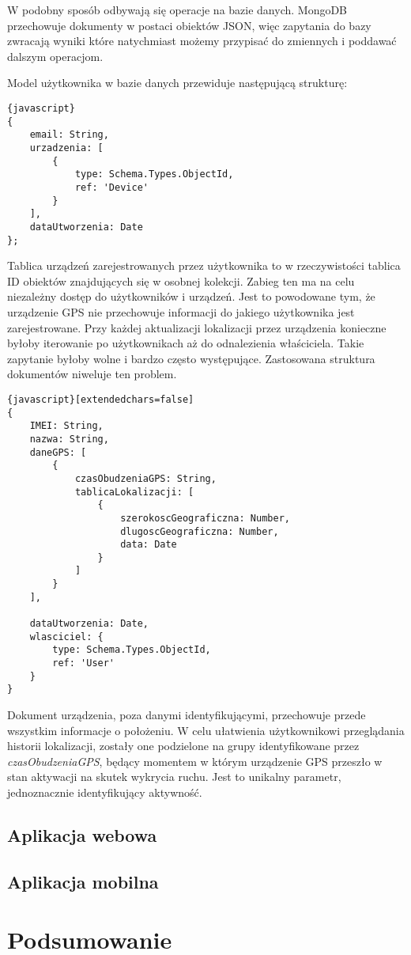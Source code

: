 \documentclass[eng,printmode]{mgr}
\begin{document}
W podobny sposób odbywają się operacje na bazie danych. MongoDB przechowuje dokumenty w postaci obiektów JSON, więc zapytania do bazy zwracają wyniki które natychmiast możemy przypisać do zmiennych i poddawać dalszym operacjom.

Model użytkownika w bazie danych przewiduje następującą strukturę:
\begin{lstlisting}{javascript}
{
    email: String,
    urzadzenia: [
        {
            type: Schema.Types.ObjectId,
            ref: 'Device'
        }
    ],
    dataUtworzenia: Date
};
\end{lstlisting}
Tablica urządzeń zarejestrowanych przez użytkownika to w rzeczywistości tablica ID obiektów znajdujących się w osobnej kolekcji. Zabieg ten ma na celu niezależny dostęp do użytkowników i urządzeń. Jest to powodowane tym, że urządzenie GPS nie przechowuje informacji do jakiego użytkownika jest zarejestrowane. Przy każdej aktualizacji lokalizacji przez urządzenia konieczne byłoby iterowanie po użytkownikach aż do odnalezienia właściciela. Takie zapytanie byłoby wolne i bardzo często występujące. Zastosowana struktura dokumentów niweluje ten problem.

\begin{lstlisting}{javascript}[extendedchars=false]
{
    IMEI: String,
    nazwa: String,
    daneGPS: [
        {
            czasObudzeniaGPS: String,
            tablicaLokalizacji: [
                {
                    szerokoscGeograficzna: Number,
                    dlugoscGeograficzna: Number,                    
                    data: Date
                }
            ]
        }
    ],

    dataUtworzenia: Date,
    wlasciciel: {
        type: Schema.Types.ObjectId,
        ref: 'User'
    }
}
\end{lstlisting}
Dokument urządzenia, poza danymi identyfikującymi, przechowuje przede wszystkim informacje o położeniu. W celu ułatwienia użytkownikowi przeglądania historii lokalizacji, zostały one podzielone na grupy identyfikowane przez \textit{czasObudzeniaGPS}, będący momentem w którym urządzenie GPS przeszło w stan aktywacji na skutek wykrycia ruchu. Jest to unikalny parametr, jednoznacznie identyfikujący aktywność.




\section{Aplikacja webowa}

\section{Aplikacja mobilna}


\chapter{Podsumowanie}

 
\end{document}
